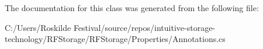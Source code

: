 \begin{DoxyCode}{0}
\DoxyCodeLine{}
\DoxyCodeLine{[Component] \textcolor{comment}{// ComponentAttribute requires implementing IComponent interface}}
\end{DoxyCode}


The documentation for this class was generated from the following file\+:\begin{DoxyCompactItemize}
\item 
C\+:/\+Users/\+Roskilde Festival/source/repos/intuitive-\/storage-\/technology/\+R\+F\+Storage/\+R\+F\+Storage/\+Properties/Annotations.\+cs\end{DoxyCompactItemize}
